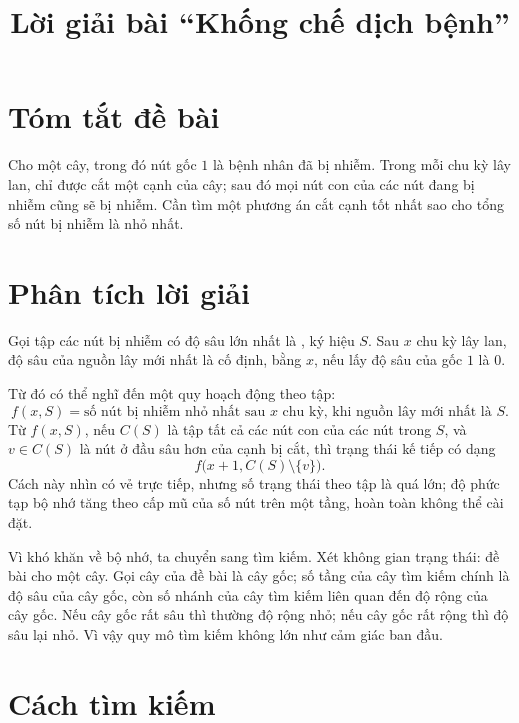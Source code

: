 \documentclass[11pt]{article}
\title{Lời giải bài ``Khống chế dịch bệnh''}
\author{}
\date{}
\begin{document}
\maketitle


\section{Tóm tắt đề bài}

Cho một cây, trong đó nút gốc \(1\) là bệnh nhân đã bị nhiễm. Trong mỗi chu kỳ
lây lan, chỉ được cắt một cạnh của cây; sau đó mọi nút con của các nút đang bị
nhiễm cũng sẽ bị nhiễm. Cần tìm một phương án cắt cạnh tốt nhất sao cho tổng
số nút bị nhiễm là nhỏ nhất.

\section{Phân tích lời giải}

Gọi tập các nút bị nhiễm có độ sâu lớn nhất là , ký
hiệu \(S\). Sau \(x\) chu kỳ lây lan, độ sâu của nguồn lây mới nhất là cố
định, bằng \(x\), nếu lấy độ sâu của gốc \(1\) là \(0\).

Từ đó có thể nghĩ đến một quy hoạch động theo tập:
\[
  f(x,S)=\text{số nút bị nhiễm nhỏ nhất sau \(x\) chu kỳ, khi nguồn lây mới
  nhất là \(S\)}.
\]
Từ \(f(x,S)\), nếu \(C(S)\) là tập tất cả các nút con của các nút trong \(S\),
và \(v\in C(S)\) là nút ở đầu sâu hơn của cạnh bị cắt, thì trạng thái kế tiếp
có dạng
\[
  f\bigl(x+1,C(S)\setminus\{v\}\bigr).
\]
Cách này nhìn có vẻ trực tiếp, nhưng số trạng thái theo tập là quá lớn; độ
phức tạp bộ nhớ tăng theo cấp mũ của số nút trên một tầng, hoàn toàn không
thể cài đặt.

Vì khó khăn về bộ nhớ, ta chuyển sang tìm kiếm. Xét không gian trạng thái:
đề bài cho một cây. Gọi cây của đề bài là cây gốc; số tầng của cây tìm kiếm
chính là độ sâu của cây gốc, còn số nhánh của cây tìm kiếm liên quan đến độ
rộng của cây gốc. Nếu cây gốc rất sâu thì thường độ rộng nhỏ; nếu cây gốc rất
rộng thì độ sâu lại nhỏ. Vì vậy quy mô tìm kiếm không lớn như cảm giác ban
đầu.

\section{Cách tìm kiếm}
\end{document}
